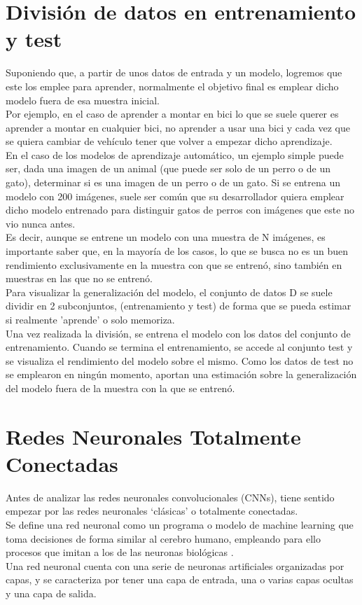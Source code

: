 \section{División de datos en entrenamiento y test}

Suponiendo que, a partir de unos datos de entrada y un modelo, logremos que este los emplee para aprender, normalmente el objetivo final es emplear dicho modelo fuera de esa muestra inicial. \\
Por ejemplo, en el caso de aprender a montar en bici lo que se suele querer es aprender a montar en cualquier bici, no aprender a usar una bici y cada vez que se quiera cambiar de vehículo tener que volver a empezar dicho aprendizaje. \\
En el caso de los modelos de aprendizaje automático, un ejemplo simple puede ser, dada una imagen de un animal (que puede ser solo de un perro o de un gato), determinar si es una imagen de un perro o de un gato. Si se entrena un modelo con 200 imágenes, suele ser común que su desarrollador quiera emplear dicho modelo entrenado para distinguir gatos de perros con imágenes que este no vio nunca antes. \\
Es decir, aunque se entrene un modelo con una muestra de N imágenes, es importante saber que, en la mayoría de los casos, lo que se busca no es un buen rendimiento exclusivamente en la muestra con que se entrenó, sino también en muestras en las que no se entrenó. \\
Para visualizar la generalización del modelo, el conjunto de datos D se suele dividir en 2 subconjuntos, (entrenamiento y test) de forma que se pueda estimar si realmente 'aprende' o solo memoriza.\\
Una vez realizada la división, se entrena el modelo con los datos del conjunto de entrenamiento. Cuando se termina el entrenamiento, se accede al conjunto test y se visualiza el rendimiento del modelo sobre el mismo. Como los datos de test no se emplearon en ningún momento, aportan una estimación sobre la generalización del modelo fuera de la muestra con la que se entrenó. 

\section{Redes Neuronales Totalmente Conectadas}

Antes de analizar las redes neuronales convolucionales (CNNs), tiene sentido empezar por las redes neuronales `clásicas' o totalmente conectadas. \\
Se define una red neuronal como un programa o modelo de machine learning que toma decisiones de forma similar al cerebro humano, empleando para ello procesos que imitan a los de las neuronas biológicas \cite{NN_intro}. \\
Una red neuronal cuenta con una serie de neuronas artificiales organizadas por capas, y se caracteriza por tener una capa de entrada, una o varias capas ocultas y una capa de salida.

